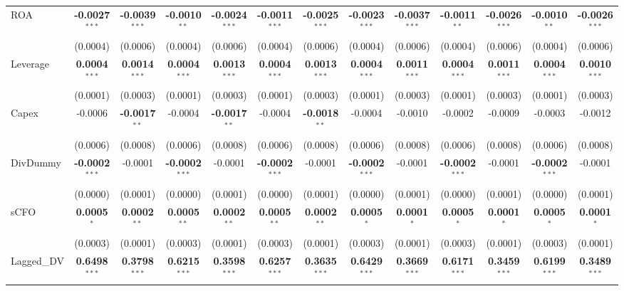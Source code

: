 \documentclass[11pt,a4paper]{article}
\begin{document}
\begin{table}[htbp]
\begin{tabular}{lcccccccccccc}
ROA & \textbf{-0.0027}$^{***}$ & \textbf{-0.0039}$^{***}$ & \textbf{-0.0010}$^{**}$ & \textbf{-0.0024}$^{***}$ & \textbf{-0.0011}$^{***}$ & \textbf{-0.0025}$^{***}$ & \textbf{-0.0023}$^{***}$ & \textbf{-0.0037}$^{***}$ & \textbf{-0.0011}$^{**}$ & \textbf{-0.0026}$^{***}$ & \textbf{-0.0010}$^{**}$ & \textbf{-0.0026}$^{***}$ \\
 & (0.0004) & (0.0006) & (0.0004) & (0.0006) & (0.0004) & (0.0006) & (0.0004) & (0.0006) & (0.0004) & (0.0006) & (0.0004) & (0.0006) \\
Leverage & \textbf{0.0004}$^{***}$ & \textbf{0.0014}$^{***}$ & \textbf{0.0004}$^{***}$ & \textbf{0.0013}$^{***}$ & \textbf{0.0004}$^{***}$ & \textbf{0.0013}$^{***}$ & \textbf{0.0004}$^{***}$ & \textbf{0.0011}$^{***}$ & \textbf{0.0004}$^{***}$ & \textbf{0.0011}$^{***}$ & \textbf{0.0004}$^{***}$ & \textbf{0.0010}$^{***}$ \\
 & (0.0001) & (0.0003) & (0.0001) & (0.0003) & (0.0001) & (0.0003) & (0.0001) & (0.0003) & (0.0001) & (0.0003) & (0.0001) & (0.0003) \\
Capex & -0.0006 & \textbf{-0.0017}$^{**}$ & -0.0004 & \textbf{-0.0017}$^{**}$ & -0.0004 & \textbf{-0.0018}$^{**}$ & -0.0004 & -0.0010 & -0.0002 & -0.0009 & -0.0003 & -0.0012 \\
 & (0.0006) & (0.0008) & (0.0006) & (0.0008) & (0.0006) & (0.0008) & (0.0006) & (0.0008) & (0.0006) & (0.0008) & (0.0006) & (0.0008) \\
DivDummy & \textbf{-0.0002}$^{***}$ & -0.0001 & \textbf{-0.0002}$^{***}$ & -0.0001 & \textbf{-0.0002}$^{***}$ & -0.0001 & \textbf{-0.0002}$^{***}$ & -0.0001 & \textbf{-0.0002}$^{***}$ & -0.0001 & \textbf{-0.0002}$^{***}$ & -0.0001 \\
 & (0.0000) & (0.0001) & (0.0000) & (0.0001) & (0.0000) & (0.0001) & (0.0000) & (0.0001) & (0.0000) & (0.0001) & (0.0000) & (0.0001) \\
sCFO & \textbf{0.0005}$^{*}$ & \textbf{0.0002}$^{**}$ & \textbf{0.0005}$^{**}$ & \textbf{0.0002}$^{**}$ & \textbf{0.0005}$^{**}$ & \textbf{0.0002}$^{**}$ & \textbf{0.0005}$^{*}$ & \textbf{0.0001}$^{*}$ & \textbf{0.0005}$^{*}$ & \textbf{0.0001}$^{*}$ & \textbf{0.0005}$^{*}$ & \textbf{0.0001}$^{*}$ \\
 & (0.0003) & (0.0001) & (0.0003) & (0.0001) & (0.0003) & (0.0001) & (0.0003) & (0.0001) & (0.0003) & (0.0001) & (0.0003) & (0.0001) \\
Lagged\_DV & \textbf{0.6498}$^{***}$ & \textbf{0.3798}$^{***}$ & \textbf{0.6215}$^{***}$ & \textbf{0.3598}$^{***}$ & \textbf{0.6257}$^{***}$ & \textbf{0.3635}$^{***}$ & \textbf{0.6429}$^{***}$ & \textbf{0.3669}$^{***}$ & \textbf{0.6171}$^{***}$ & \textbf{0.3459}$^{***}$ & \textbf{0.6199}$^{***}$ & \textbf{0.3489}$^{***}$ \\

\end{tabular}
\end{table}
\end{document}
